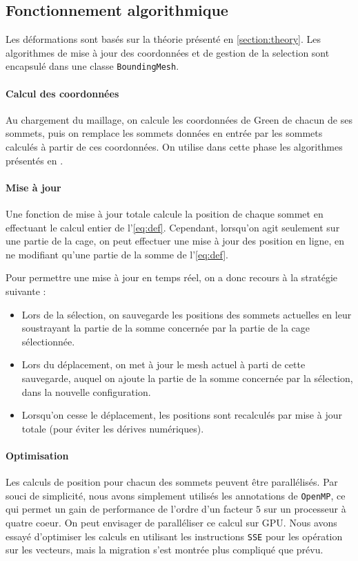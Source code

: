 \documentclass[10pt,a4paper]{article}
\begin{document}
\subsection{Fonctionnement algorithmique}

Les déformations sont basés sur la théorie présenté en \autoref{section:theory}. Les algorithmes de mise à jour des coordonnées et de gestion de la selection sont encapsulé dans une classe \texttt{BoundingMesh}.

\paragraph{Calcul des coordonnées}Au chargement du maillage, on calcule les coordonnées de Green de chacun de ses sommets, puis on remplace les sommets données en entrée par les sommets calculés à partir de ces coordonnées. On utilise dans cette phase les algorithmes présentés en \cite{lipman2008green}.

\paragraph{Mise à jour}Une fonction de mise à jour totale calcule la position de chaque sommet en effectuant le calcul entier de l'\autoref{eq:def}. Cependant, lorsqu'on agit seulement sur une partie de la cage, on peut effectuer une mise à jour des position en ligne, en ne modifiant qu'une partie de la somme de l'\autoref{eq:def}.

Pour permettre une mise à jour en temps réel, on a donc recours à la stratégie suivante :
\begin{itemize}
\item Lors de la sélection, on sauvegarde les positions des sommets actuelles en leur soustrayant la partie de la somme concernée par la partie de la cage sélectionnée.
\item Lors du déplacement, on met à jour le mesh actuel à parti de cette sauvegarde, auquel on ajoute la partie de la somme concernée par la sélection, dans la nouvelle configuration.
\item Lorsqu'on cesse le déplacement, les positions sont recalculés par mise à jour totale (pour éviter les dérives numériques).
\end{itemize}

\paragraph{Optimisation}Les calculs de position pour chacun des sommets peuvent être parallélisés. Par souci de simplicité, nous avons simplement utilisés les annotations de \texttt{OpenMP}, ce qui permet un gain de performance de l'ordre d'un facteur $5$ sur un processeur à quatre coeur. On peut envisager de paralléliser ce calcul sur GPU. Nous avons essayé d'optimiser les calculs en utilisant les instructions \texttt{SSE} pour les opération sur les vecteurs, mais la migration s'est montrée plus compliqué que prévu.
\end{document}
